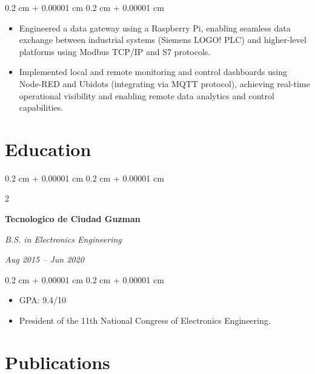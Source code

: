 \documentclass[10pt, letterpaper]{article}
\newenvironment{highlights}{
    \begin{itemize}[
        topsep=0.10 cm,
        parsep=0.10 cm,
        partopsep=0pt,
        itemsep=0pt,
        leftmargin=0.4 cm + 10pt
    ]
}{
    \end{itemize}
} %
\newenvironment{onecolentry}{
    \begin{adjustwidth}{
        0.2 cm + 0.00001 cm
    }{
        0.2 cm + 0.00001 cm
    }
}{
    \end{adjustwidth}
} %
\newenvironment{twocolentry}[2][]{
    \onecolentry
    \def\secondColumn{#2}
    \setcolumnwidth{\fill, 4.5 cm}
    \begin{paracol}{2}
}{
    \switchcolumn \raggedleft \secondColumn
    \end{paracol}
    \endonecolentry
} %
\begin{document}
    \vspace{0.10 cm}
    \begin{onecolentry}
        \begin{highlights}
            \item Engineered a data gateway using a Raspberry Pi, enabling seamless data exchange between industrial systems (Siemens LOGO! PLC) and higher-level platforms using Modbus TCP/IP and S7 protocols. %
            
            \item Implemented local and remote monitoring and control dashboards using Node-RED and Ubidots (integrating via MQTT protocol), achieving real-time operational visibility and enabling remote data analytics and control capabilities. %
        \end{highlights}
    \end{onecolentry}

    
    \section{Education}



        
        \begin{twocolentry}{
            
        \textit{Aug 2015 – Jun 2020}}
            \textbf{Tecnologico de Ciudad Guzman}

            \textit{B.S. in Electronics Engineering}
        \end{twocolentry}

        \vspace{0.10 cm}
        \begin{onecolentry}
            \begin{highlights}
                \item GPA: 9.4/10 
                \item President of the 11th National Congress of Electronics Engineering.
            \end{highlights}
        \end{onecolentry}

    \section{Publications}
\end{document}
